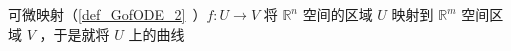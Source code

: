 
可微映射（\autoref{def_GofODE_2}~）$f:U\rightarrow V$ 将 $\mathbb R^n$ 空间的区域 $U$ 映射到 $\mathbb R^m$ 空间区域 $V$ ，于是就将 $U$ 上的曲线 